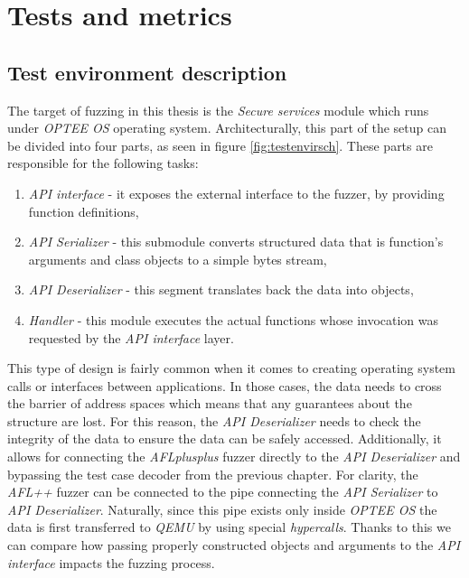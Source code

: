 \cleardoublepage
\section{Tests and metrics} \label{chap:tests}

\subsection{Test environment description}

The target of fuzzing in this thesis is the \textit{Secure services} module which runs under \textit{OPTEE OS} operating system. Architecturally, this part of the setup can be divided into four parts, as seen in figure \ref{fig:testenvirsch}. These parts are responsible for the following tasks:
\begin{enumerate}
    \item \textit{API interface} - it exposes the external interface to the fuzzer, by providing function definitions,
    \item \textit{API Serializer} - this submodule converts structured data that is function's arguments and class objects to a simple bytes stream,
    \item \textit{API Deserializer} - this segment translates back the data into objects,
    \item \textit{Handler} - this module executes the actual functions whose invocation was requested by the \textit{API interface} layer.
\end{enumerate}
This type of design is fairly common when it comes to creating operating system calls or interfaces between applications. In those cases, the data needs to cross the barrier of address spaces which means that any guarantees about the structure are lost. For this reason, the \textit{API Deserializer} needs to check the integrity of the data to ensure the data can be safely accessed. Additionally, it allows for connecting the \textit{AFLplusplus} fuzzer directly to the \textit{API Deserializer} and bypassing the test case decoder from the previous chapter. For clarity, the \textit{AFL++} fuzzer can be connected to the pipe connecting the \textit{API Serializer} to \textit{API Deserializer}. Naturally, since this pipe exists only inside \textit{OPTEE OS} the data is first transferred to \textit{QEMU} by using special \textit{hypercalls}. Thanks to this we can compare how passing properly constructed objects and arguments to the \textit{API interface} impacts the fuzzing process.

